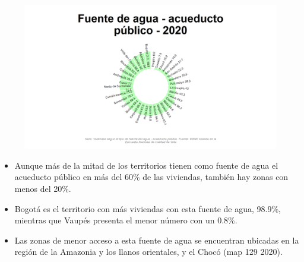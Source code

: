     \begin{figure}[H]
        \caption[Acueducto público como fuentes de agua por departamentos para 2020 ]{\label{cueducto_publico_dptos} }
        \begin{center}
        \includegraphics[width=\textwidth,keepaspectratio]{img/var_129_static.png}
        \end{center}
    \end{figure}
            \begin{itemize}
                    \item Aunque más de la mitad de los territorios tienen como fuente de agua el acueducto público en más del 60\% de las viviendas, también hay zonas con menos del 20\%.
                    \item Bogotá es el territorio con más viviendas con esta fuente de agua, 98.9\%, mientras que Vaupés presenta el menor número con un 0.8\%.
                    \item Las zonas de menor acceso a esta fuente de agua se encuentran ubicadas en la región de la Amazonia y los llanos orientales, y el Chocó (map 129 2020).
                    \end{itemize}

